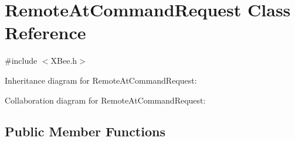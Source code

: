 \hypertarget{class_remote_at_command_request}{}\section{Remote\+At\+Command\+Request Class Reference}
\label{class_remote_at_command_request}


{\ttfamily \#include $<$X\+Bee.\+h$>$}



Inheritance diagram for Remote\+At\+Command\+Request\+:


Collaboration diagram for Remote\+At\+Command\+Request\+:
\subsection*{Public Member Functions}
